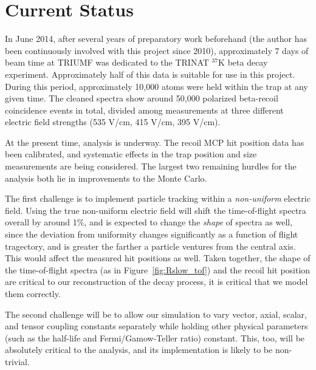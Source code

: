 %
\section{Current Status}
\label{status}
In June 2014, after several years of preparatory work beforehand (the author has been continuously involved with this project since 2010), approximately 7 days of beam time at TRIUMF was dedicated to the TRINAT $^{37}\textrm{K}$ beta decay experiment.  Approximately half of this data is suitable for use in this project.  During this period, approximately 10,000 atoms were held within the trap at any given time.  The cleaned spectra show around 50,000 polarized beta-recoil coincidence events in total, divided among measurements at three different electric field strengths (535 V/cm, 415 V/cm, 395 V/cm). 

At the present time, analysis is underway.  The recoil MCP hit position data has been calibrated, and systematic effects in the trap position and size measurements are being considered.  The largest two remaining hurdles for the analysis both lie in improvements to the Monte Carlo.  

The first challenge is to implement particle tracking within a \emph{non-uniform} electric field.  Using the true non-uniform electric field will shift the time-of-flight spectra overall by around 1\%, and is expected to change the \emph{shape} of spectra as well, since the deviation from uniformity changes significantly as a function of flight tragectory, and is greater the farther a particle ventures from the central axis.  This would affect the measured hit positions as well.  Taken together, the shape of the time-of-flight spectra (as in Figure~\ref{fig:Rslow_tof}) and the recoil hit position are critical to our reconstruction of the decay process, it is critical that we model them correctly.  

The second challenge will be to allow our simulation to vary vector, axial, scalar, and tensor coupling constants separately while holding other physical parameters (such as the half-life and Fermi/Gamow-Teller ratio) constant.  This, too, will be absolutely critical to the analysis, and its implementation is likely to be non-trivial.

